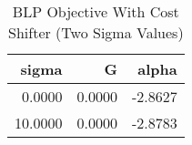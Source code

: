 \begin{table}[htbp]
    \centering
    \caption{BLP Objective With Cost Shifter (Two Sigma Values)}
    \label{tab:q5_blp_costshifter_G}
\toprule
\begin{tabular}{rrr}
\toprule
sigma & G & alpha \\
\midrule
\midrule
0.0000 & 0.0000 & -2.8627 \\
10.0000 & 0.0000 & -2.8783 \\
\bottomrule
\bottomrule
\end{tabular}

\end{table}
